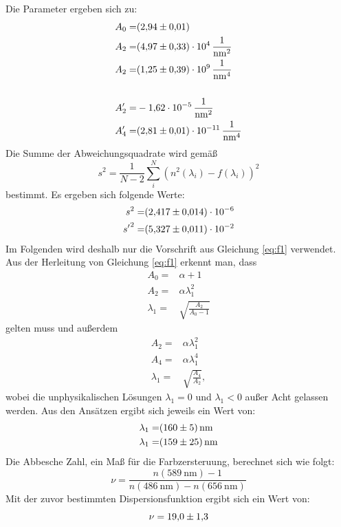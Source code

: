 \noindent
Die Parameter ergeben sich zu:
\begin{align}
	A_0 =& \SI{2.94\pm0.01}{} \\
	A_2 =& \SI{4.97\pm0.33e4}{\per\nano\meter\squared} \\
	A_2 =& \SI{1.25\pm0.39e9}{\per\nano\meter\tothe{4}} \\
\nonumber \\
	A_2' =& \SI{-1.62\pm0.00e-5}{\per\nano\meter\squared} \\
	A_4' =& \SI{2.81\pm0.01e-11}{\per\nano\meter\tothe{4}} 
\end{align}
Die Summe der Abweichungsquadrate wird gemäß
\begin{equation}
	s^2 = \frac{1}{N-2}\sum_i^N\left(n^2(\lambda_i) - f(\lambda_i)\right)^2
\end{equation}
bestimmt.
Es ergeben sich folgende Werte:
\begin{align}
	s^2 =& \num{2.417\pm0.014e-6} \\
	{s'}^2 =& \num{5.327\pm0.011e-2} 
\end{align}
Im Folgenden wird deshalb nur die Vorschrift aus Gleichung \eqref{eq:f1} verwendet.
Aus der Herleitung von Gleichung \eqref{eq:f1} erkennt man, dass
\begin{align}
	A_0 =& \alpha + 1 \\
	A_2 =& \alpha\lambda_1^2 \\
	\lambda_1 =& \sqrt{\frac{A_2}{A_0 - 1}} 
\end{align}
gelten muss und außerdem
\begin{align}
	A_2 =& \alpha\lambda_1^2 \\
	A_4 =& \alpha\lambda_1^4 \\
	\lambda_1 =& \sqrt{\frac{A_4}{A_2}}, 
\end{align}
wobei die unphysikalischen Lösungen $\lambda_1 = 0$ und $\lambda_1 < 0$ außer Acht gelassen werden.
Aus den Ansätzen ergibt sich jeweils ein Wert von:
\begin{align}
	\lambda_1 =& \SI{160\pm5}{\nano\meter} \\
	\lambda_1 =& \SI{159\pm25}{\nano\meter} 
\end{align}
Die Abbesche Zahl, ein Maß für die Farbzersteruung, berechnet sich wie folgt:
\begin{equation}
	\nu = \frac{n(\SI{589}{\nano\meter})-1}{n(\SI{486}{\nano\meter})-n(\SI{656}{\nano\meter})}
\end{equation}
Mit der zuvor bestimmten Dispersionsfunktion ergibt sich ein Wert von:
\begin{equation}
	\nu = \num{19.0\pm1.3}
\end{equation}
